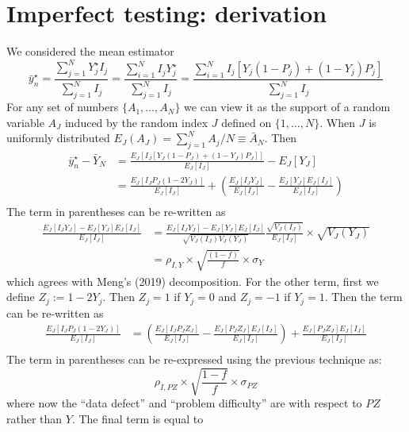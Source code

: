 \documentclass[aoas]{amsart}
\begin{document}



\appendix

\section{Imperfect testing: derivation}
\label{app:imperfect}
We considered the mean estimator
$$
\bar y_n^\star = \frac{\sum_{j=1}^N Y_j^\star I_j}{\sum_{j=1}^N I_j} = \frac{\sum_{i=1}^N  I_j Y_j^\star }{\sum_{j=1}^N  I_j } = \frac{\sum_{i=1}^N  I_j \left[ Y_j (1-P_j) + (1-Y_j) P_j \right]}{\sum_{j=1}^N  I_j }
$$
For any set of numbers $\{ A_1, \ldots, A_N \}$ we can view it as the support of a random variable $A_J$ induced by the random index $J$ defined on $\{1,\ldots, N\}$.  When $J$ is uniformly distributed $E_J (A_J) = \sum_{j=1}^N A_j / N \equiv \bar A_N$. Then
$$
\begin{aligned}
\bar y_n^\star  - \bar Y_N &= \frac{E_J \left[ I_J \left[ Y_J (1-P_J) + (1-Y_J) P_J \right] \right]}{E_J [ I_J ] } - E_J[Y_J] \\
&= \frac{E_J \left[ I_J P_J (1-2Y_J) \right]}{E_J [ I_J ] } + \left( \frac{E_J [I_J Y_J]}{E_J [ I_J ] } - \frac{E_J[Y_J] E_J[I_J]}{E_J[I_J]} \right) \\
\end{aligned}
$$
The term in parentheses can be re-written as
$$
\begin{aligned}
\frac{E_J [I_J Y_J]- E_J[Y_J] E_J[I_J]}{E_J[I_J]} &=  \frac{E_J [I_J Y_J]- E_J[Y_J] E_J[I_J]}{\sqrt{V_J(I_J) V_J(Y_J)}} \frac{\sqrt{V_J(I_J)}}{E_J[I_J]} \times \sqrt{V_J(Y_J)} \\
&= \rho_{I,Y} \times \sqrt{\frac{(1-f)}{f}} \times \sigma_Y
\end{aligned}
$$
which agrees with Meng's (2019) decomposition. For the other term, first we define $Z_j := 1 - 2 Y_j $. Then $Z_j = 1$ if $Y_j = 0$ and $Z_j = -1$ if $Y_j = 1$. Then the term can be re-written as
$$
\begin{aligned}
\frac{E_J \left[ I_J P_J (1-2Y_J) \right]}{E_J [ I_J ] } &= \left( \frac{E_J \left[ I_J P_J Z_J \right]}{E_J [ I_J ] } -  \frac{E_J \left[ P_J Z_J \right] E_J[ I_J]}{E_J [ I_J ] } \right) +  \frac{E_J \left[ P_J Z_J \right] E_J[ I_J]}{E_J [ I_J ] } \\
\end{aligned}
$$
The term in parentheses can be re-expressed using the previous technique as:
$$
\rho_{I, PZ} \times \sqrt{\frac{1-f}{f}} \times \sigma_{PZ}
$$
where now the ``data defect'' and ``problem difficulty'' are with respect to $PZ$ rather than $Y$. The final term is equal to
\end{document}
